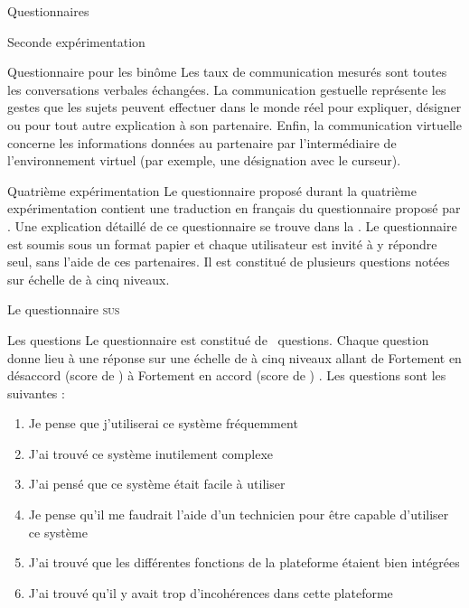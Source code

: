 \documentclass[myfrancais,ngerman,english,french]{mythesis}
\begin{document}
\begin{mychapter}{Questionnaires}
\begin{mysection}{Seconde expérimentation}
\begin{mysubsection}{Questionnaire pour les binôme}
				Les taux de communication mesurés sont toutes les conversations verbales échangées.
				La communication gestuelle représente les gestes que les sujets peuvent effectuer dans le monde réel pour expliquer, désigner ou pour tout autre explication à son partenaire.
				Enfin, la communication virtuelle concerne les informations données au partenaire par l'intermédiaire de l'environnement virtuel (par exemple, une désignation avec le curseur).
			\end{mysubsection}
		\end{mysection}
		\begin{mysection}{Quatrième expérimentation}
			Le questionnaire proposé durant la quatrième expérimentation contient une traduction en français du questionnaire  proposé par .
			Une explication détaillé de ce questionnaire se trouve dans la .
			Le questionnaire est soumis sous un format papier et chaque utilisateur est invité à y répondre seul, sans l'aide de ces partenaires.
			Il est constitué de plusieurs questions notées sur échelle de  à cinq niveaux.
			\begin{mysubsection}{Le questionnaire \textsc{sus}}
				\begin{mysubsubsection}{Les questions}
					Le questionnaire  est constitué de ~questions.
					Chaque question donne lieu à une réponse sur une échelle de  à cinq niveaux allant de \og Fortement en désaccord (score de ) \fg à \og Fortement en accord (score de ) \fg.
					Les questions sont les suivantes :
					\begin{enumerate}[label={Q\arabic*.},ref={Q\arabic*}]
						\item Je pense que j'utiliserai ce système fréquemment
						\item J'ai trouvé ce système inutilement complexe
						\item J'ai pensé que ce système était facile à utiliser
						\item Je pense qu'il me faudrait l'aide d'un technicien pour être capable d'utiliser ce système
						\item J'ai trouvé que les différentes fonctions de la plateforme étaient bien intégrées
						\item J'ai trouvé qu'il y avait trop d'incohérences dans cette plateforme

\end{enumerate}
\end{mysubsubsection}
\end{mysubsection}
\end{mysection}
\end{mychapter}
\end{document}
